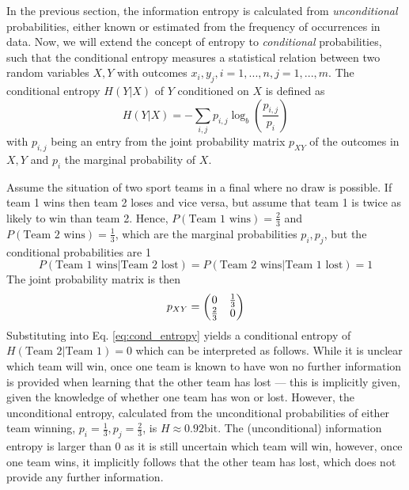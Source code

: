 In the previous section, the information entropy is calculated from \emph{unconditional} probabilities, either known or estimated
from the frequency of occurrences in data. Now, we will extend the concept of entropy to \emph{conditional} probabilities, such
that the conditional entropy measures a statistical relation between two random variables $X,Y$ with outcomes $x_i,y_j,
i = 1,...,n, j = 1,...,m$. The conditional entropy $H(Y\vert X)$ of $Y$ conditioned on $X$ is defined as
\begin{equation}
	H(Y \vert X) = - \sum_{i,j} p_{i,j} \log_b \left( \frac{p_{i,j}}{p_i} \right)
	\label{eq:cond_entropy}
\end{equation}
with $p_{i,j}$ being an entry from the joint probability matrix $p_{XY}$ of the outcomes in $X,Y$ and $p_i$ the marginal probability of $X$.

Assume the situation of two sport teams in a final where no draw is possible. If team 1 wins then team 2 loses and vice versa,
but assume that team 1 is twice as likely to win than team 2. Hence, $P(\text{Team 1 wins}) = \tfrac{2}{3}$ and $P(\text{Team 2 wins})
= \tfrac{1}{3}$, which are the marginal probabilities $p_i,p_j$, but the conditional probabilities are 1
\begin{equation}
P(\text{Team 1 wins}\vert \text{Team 2 lost}) = P(\text{Team 2 wins}\vert \text{Team 1 lost}) = 1
\end{equation}
The joint probability matrix is then
\begin{equation}
	p_{XY} = \begin{pmatrix} 0 & \tfrac{1}{3} \\
				\tfrac{2}{3} & 0 \end{pmatrix}
\end{equation}
Substituting into Eq. \ref{eq:cond_entropy} yields a conditional entropy of $H(\text{Team 2} \vert \text{Team 1}) = 0$ which can be
interpreted as follows. While it is unclear which team will win, once one team is known to have won no further information is 
provided when learning that the other team has lost --- this is implicitly given, given the knowledge of whether one team has won or lost.
However, the unconditional entropy, calculated from the unconditional probabilities of either team winning, $p_i = \tfrac{1}{3},
p_j = \tfrac{2}{3}$, is $H \approx 0.92\mathrm{bit}$. The (unconditional) information entropy is larger than 0 as it is
still uncertain which team will win, however, once one team wins, it implicitly follows that the other team has lost, which does not
provide any further information. 

